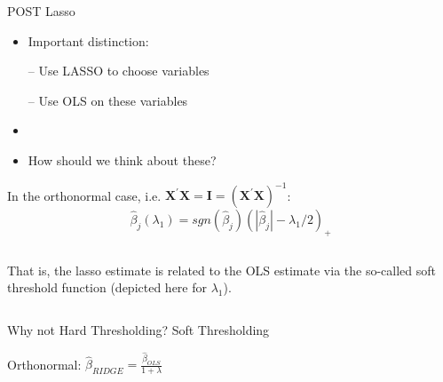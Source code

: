 \documentclass{beamer}
\newcommand{\X}{\mathbf{X}}
\begin{document}
\begin{frame}{POST Lasso}
	\begin{itemize}
		\item Important distinction:
		
		– Use LASSO to choose variables 
		
		– Use OLS on these variables
		\item[]
		\item How should we think about these?
	\end{itemize}
\end{frame}

\begin{frame}
	
\end{frame}

\begin{frame}
	In the orthonormal case, i.e. $\X^{'}\X=\mathbf{I}=(\X^{'}\X)^{-1}$:
	$$\hat{\beta}_j(\lambda_1)=sgn(\hat{\beta}_j)(|\hat{\beta}_j|-\lambda_1/2)_+$$
		\begin{columns}
		\begin{column}{0.4\textwidth}
		That is, the lasso estimate is related to the OLS estimate via the so-called {\color{blue}soft threshold function} (depicted here for $\lambda_1$).
		\end{column}
		
		\begin{column}{0.6\textwidth}

		\end{column}
	\end{columns}
\end{frame}

\begin{frame}{Why not Hard Thresholding?}
	\centering Soft Thresholding
\end{frame}

\begin{frame}
	\centering	
	Orthonormal: $\hat{\beta}_{RIDGE}=\frac{\hat{\beta}_{OLS}}{1+\lambda}$

\end{frame}
\end{document}
